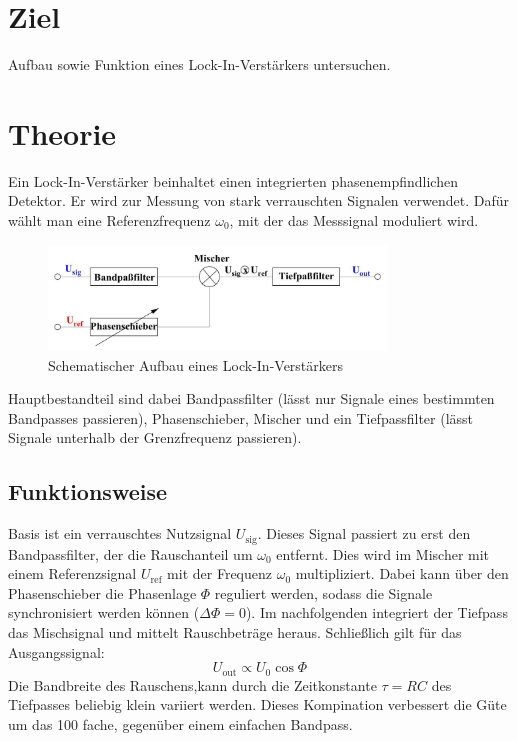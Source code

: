 \newpage
\section*{Ziel}
Aufbau sowie Funktion eines Lock-In-Verstärkers untersuchen.

\section{Theorie}
\label{sec:theorie}

Ein Lock-In-Verstärker beinhaltet einen integrierten phasenempfindlichen Detektor.
Er wird zur Messung von stark verrauschten Signalen verwendet.
Dafür wählt man eine Referenzfrequenz $\omega_0$, mit der das Messsignal moduliert wird.
\begin{figure}[H]
    \centering
    \includegraphics[width=0.8\textwidth]{bilder/aufbau_schema.jpg}
    \caption{Schematischer Aufbau eines Lock-In-Verstärkers \cite[1]{Anleitung}}
    \label{fig:aufbau_generell}
\end{figure}

Hauptbestandteil sind dabei Bandpassfilter (lässt nur Signale eines bestimmten Bandpasses passieren),
Phasenschieber, Mischer und ein Tiefpassfilter (lässt Signale unterhalb der Grenzfrequenz passieren).
\subsection{Funktionsweise}

Basis ist ein verrauschtes Nutzsignal $U_{\text{sig}}$. Dieses Signal
passiert zu erst den Bandpassfilter, der die Rauschanteil um $\omega_0$ entfernt.
Dies wird im Mischer mit einem Referenzsignal $U_{\text{ref}}$ mit der Frequenz $\omega_0$ multipliziert.
Dabei kann über den Phasenschieber die Phasenlage $\Phi$ reguliert werden, sodass
die Signale synchronisiert werden können ($\Delta \Phi=0$).
Im nachfolgenden integriert der Tiefpass das Mischsignal und mittelt Rauschbeträge
heraus. Schließlich gilt für das Ausgangssignal:
\begin{equation}
    U_{\text{out}} \propto U_0 \;\textrm{cos}\;\Phi
\end{equation}
Die Bandbreite des Rauschens,kann durch die Zeitkonstante $\tau=RC$
des Tiefpasses beliebig klein variiert werden.
Dieses Kompination verbessert die Güte um das 100 fache, gegenüber einem
einfachen Bandpass.
